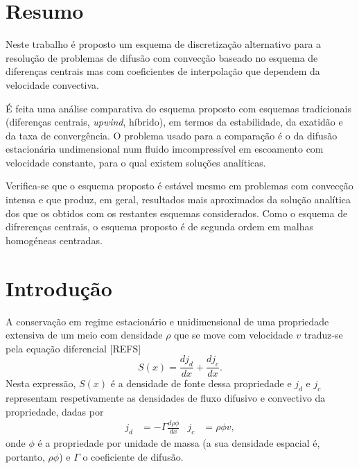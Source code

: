 \documentclass[11pt,twoside]{article}
\begin{document}
{\setlength{\parindent}{30pt}%

\small%
\section*{Resumo}
\smallskip
Neste trabalho é proposto um esquema de discretização alternativo para a
resolução de problemas de difusão com convecção baseado no esquema de diferenças
centrais mas com coeficientes de interpolação que dependem da velocidade
convectiva.

É feita uma análise comparativa do esquema proposto com esquemas tradicionais
(diferenças centrais, \emph{upwind}, híbrido), em termos da estabilidade, da
exatidão e da taxa de convergência. O problema usado para a comparação é o da
difusão estacionária undimensional num fluido imcompressível em escoamento com
velocidade constante, para o qual existem soluções analíticas.

Verifica-se que o esquema proposto é estável mesmo em problemas com convecção
intensa e que produz, em geral, resultados mais aproximados da solução analítica
dos que os obtidos com os restantes esquemas considerados. Como o esquema de
difrerenças centrais, o esquema proposto é de segunda ordem em malhas homogéneas
centradas.

\vspace{15pt}





\section{Introdução}
A conservação em regime estacionário e unidimensional de uma propriedade
extensiva de um meio com densidade $\rho$ que se move com velocidade $v$
traduz-se pela equação diferencial [REFS]
\begin{equation}
    S(x) = \frac{dj_d}{dx}+\frac{dj_c}{dx}.\label{eq:dif}
\end{equation}
Nesta expressão, $S(x)$ é a densidade de fonte dessa propriedade e $j_d$ e $j_c$
representam respetivamente as densidades de fluxo difusivo e convectivo da
propriedade, dadas por
\begin{align}
    j_d&=-\Gamma\frac{d\rho\phi}{dx}&
    j_c&=\rho\phi v,
\end{align}
onde $\phi$ é a propriedade por unidade de massa (a sua densidade espacial
é, portanto, $\rho\phi$) e $\Gamma$ o coeficiente de difusão.

}
\end{document}
